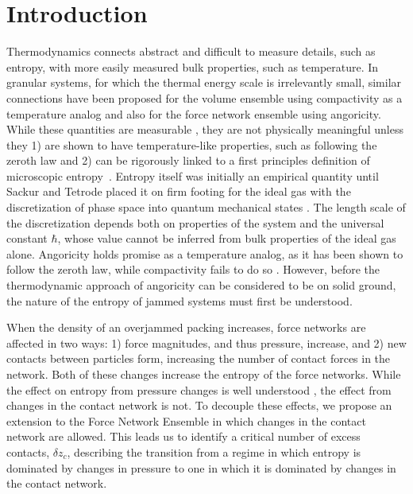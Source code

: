 \section{Introduction}
Thermodynamics connects abstract and difficult to measure details, such as entropy, with more easily measured bulk properties, such as temperature. In granular systems, for which the thermal energy scale is irrelevantly small, similar connections have been proposed for the volume ensemble \cite{edwards_theory_1989,bi_statistical_2015} using compactivity as a temperature analog and also for the force network ensemble \cite{edwards_distribution_2008, bi_statistical_2015} using angoricity. 
While these quantities are measurable \cite{puckett_equilibrating_2013,bililign_protocol_2019}, they are not physically meaningful unless they 1) are shown to have temperature-like properties, such as following the zeroth law and 2) can be rigorously linked to a first principles definition of microscopic entropy~\cite{grimus_100th_2013}. 
Entropy itself was initially an empirical quantity until Sackur and Tetrode placed it on firm footing for the ideal gas with the discretization of phase space into quantum mechanical states \cite{tetrode_chemische_1912,grimus_100th_2013}. The length scale of the discretization depends both on properties of the system and the universal constant $\hbar$, whose value cannot be inferred from bulk properties of the ideal gas alone.
Angoricity holds promise as a temperature analog, as it has been shown to follow the zeroth law, while compactivity fails to do so \cite{bi_statistical_2015, puckett_equilibrating_2013,edwards_granular_2002}. However, before the thermodynamic approach of angoricity can be considered to be on solid ground, the nature of the entropy of jammed systems must first be understood. 

When the density of an overjammed packing increases, force networks are affected in two ways: 1) force magnitudes, and thus pressure, increase, and 2) new contacts between particles form, increasing the number of contact forces in the network. Both of these changes increase the entropy of the force networks. While the effect on entropy from  pressure changes is well understood \cite{bililign_protocol_2019,henkes_statistical_2009}, the effect from changes in the contact network is not. To decouple these effects, we propose an extension to the Force Network Ensemble in which changes in the contact network are allowed. This leads us to identify a critical number of excess contacts, $\delta z_c$, describing the transition from a regime in which entropy is dominated by changes in pressure to one in which it is dominated by changes in the contact network.

